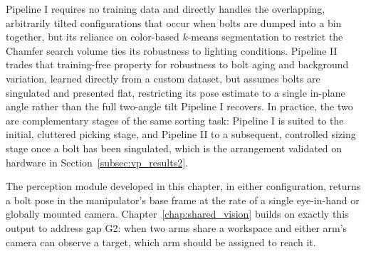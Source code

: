 Pipeline I requires no training data and directly handles the overlapping, arbitrarily tilted
configurations that occur when bolts are dumped into a bin together, but its reliance on
color-based $k$-means segmentation to restrict the Chamfer search volume ties its robustness to
lighting conditions. Pipeline II trades that training-free property for robustness to bolt aging
and background variation, learned directly from a custom dataset, but assumes bolts are singulated
and presented flat, restricting its pose estimate to a single in-plane angle rather than the full
two-angle tilt Pipeline I recovers. In practice, the two are complementary stages of the same
sorting task: Pipeline I is suited to the initial, cluttered picking stage, and Pipeline II to a
subsequent, controlled sizing stage once a bolt has been singulated, which is the arrangement
validated on hardware in Section~\ref{subsec:vp_results2}.

The perception module developed in this chapter, in either configuration, returns a bolt pose in
the manipulator's base frame at the rate of a single eye-in-hand or globally mounted camera.
Chapter~\ref{chap:shared_vision} builds on exactly this output to address gap G2: when two arms share a workspace and
either arm's camera can observe a target, which arm should be assigned to reach it.
